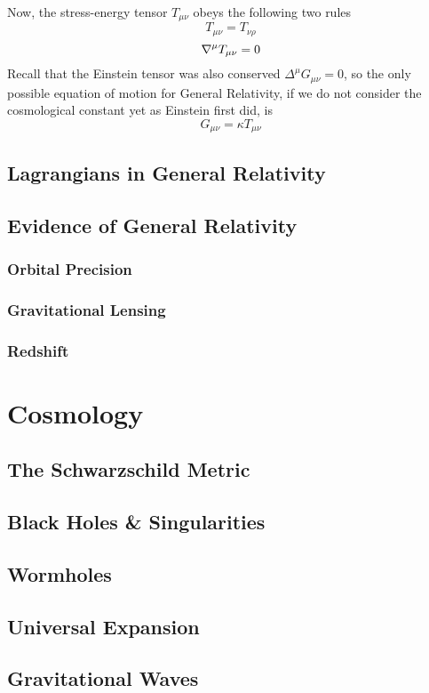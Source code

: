 \documentclass{article}
\begin{document}
 		Now, the stress-energy tensor $T_{\mu\nu}$ obeys the following two rules
 		\begin{equation}
 			\label{eq:SET-1}
 			T_{\mu\nu} = T_{\nu\rho}
 		\end{equation}
 		\begin{equation}
 			\label{eq:SET-2}
 			\nabla^\mu T_{\mu\nu} = 0
 		\end{equation}
 		Recall that the Einstein tensor was also conserved $\Delta^\mu G_{\mu\nu} = 0$, so the only possible equation of motion for General Relativity, if we do not consider the cosmological constant yet as Einstein first did, is
 		\begin{equation}
 			\label{eq:EFE-wrong}
 			\boxed{G_{\mu\nu} = \kappa T_{\mu\nu}}
 		\end{equation}
 		
 	\subsection{Lagrangians in General Relativity}
 	\subsection{Evidence of General Relativity}
 	\subsubsection{Orbital Precision}
 	\subsubsection{Gravitational Lensing}
 	\subsubsection{Redshift}
 	\section{Cosmology}
 	\subsection{The Schwarzschild Metric}
 	\subsection{Black Holes \& Singularities}
 	\subsection{Wormholes}
 	\subsection{Universal Expansion}
 	\subsection{Gravitational Waves}
 	
\end{document}
